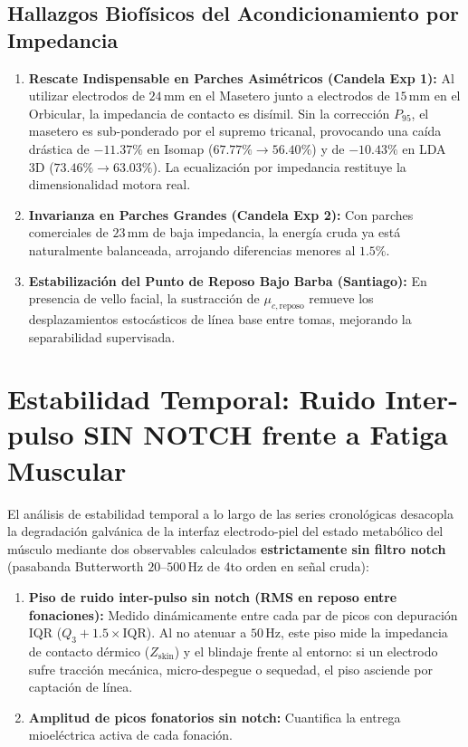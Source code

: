 \documentclass[11pt,a4paper]{article}
\begin{document}
\subsection{Hallazgos Biofísicos del Acondicionamiento por Impedancia}
\begin{enumerate}
    \item \textbf{Rescate Indispensable en Parches Asimétricos (Candela Exp 1):} Al utilizar electrodos de $24\,\text{mm}$ en el Masetero junto a electrodos de $15\,\text{mm}$ en el Orbicular, la impedancia de contacto es disímil. Sin la corrección $P_{95}$, el masetero es sub-ponderado por el supremo tricanal, provocando una caída drástica de $-11.37\%$ en Isomap ($67.77\% \to 56.40\%$) y de $-10.43\%$ en LDA 3D ($73.46\% \to 63.03\%$). La ecualización por impedancia restituye la dimensionalidad motora real.
    \item \textbf{Invarianza en Parches Grandes (Candela Exp 2):} Con parches comerciales de $23\,\text{mm}$ de baja impedancia, la energía cruda ya está naturalmente balanceada, arrojando diferencias menores al $1.5\%$.
    \item \textbf{Estabilización del Punto de Reposo Bajo Barba (Santiago):} En presencia de vello facial, la sustracción de $\mu_{c,\text{reposo}}$ remueve los desplazamientos estocásticos de línea base entre tomas, mejorando la separabilidad supervisada.
\end{enumerate}

\section{Estabilidad Temporal: Ruido Inter-pulso SIN NOTCH frente a Fatiga Muscular}

El análisis de estabilidad temporal a lo largo de las series cronológicas desacopla la degradación galvánica de la interfaz electrodo-piel del estado metabólico del músculo mediante dos observables calculados \textbf{estrictamente sin filtro notch} (pasabanda Butterworth $20\text{--}500\,\text{Hz}$ de 4to orden en señal cruda):
\begin{enumerate}
    \item \textbf{Piso de ruido inter-pulso sin notch (RMS en reposo entre fonaciones):} Medido dinámicamente entre cada par de picos con depuración IQR ($Q_3 + 1.5 \times \text{IQR}$). Al no atenuar a $50\,\text{Hz}$, este piso mide la impedancia de contacto dérmico ($Z_{\text{skin}}$) y el blindaje frente al entorno: si un electrodo sufre tracción mecánica, micro-despegue o sequedad, el piso asciende por captación de línea.
    \item \textbf{Amplitud de picos fonatorios sin notch:} Cuantifica la entrega mioeléctrica activa de cada fonación.
\end{enumerate}
\end{document}
